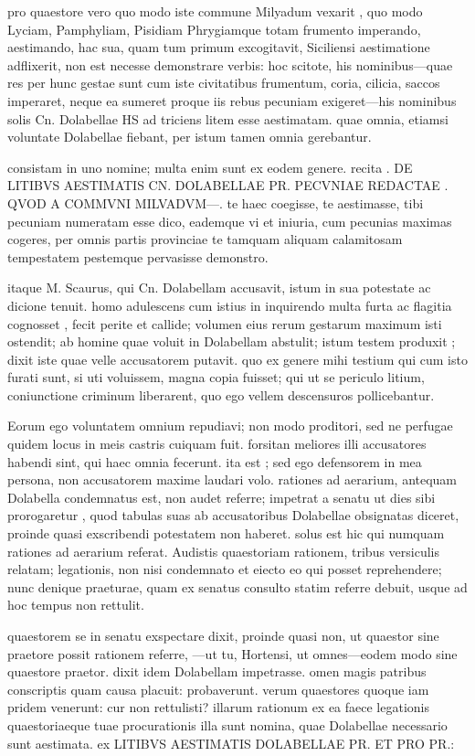  pro quaestore vero quo modo iste commune Milyadum vexarit , quo modo Lyciam, Pamphyliam, Pisidiam Phrygiamque totam frumento imperando, aestimando, hac sua, quam tum primum excogitavit, Siciliensi aestimatione adflixerit, non est necesse demonstrare verbis: hoc scitote, his nominibus—quae res per hunc gestae sunt cum iste civitatibus frumentum, coria, cilicia, saccos imperaret, neque ea sumeret proque iis rebus pecuniam exigeret—his nominibus solis Cn. Dolabellae HS ad triciens litem esse aestimatam. quae omnia, etiamsi voluntate Dolabellae fiebant, per istum tamen omnia gerebantur.

 consistam in uno nomine; multa enim sunt ex eodem genere. recita . DE LITIBVS AESTIMATIS CN. DOLABELLAE PR. PECVNIAE REDACTAE . QVOD A COMMVNI MILVADVM—. te haec coegisse, te aestimasse, tibi pecuniam numeratam esse dico, eademque vi et iniuria, cum pecunias maximas cogeres, per omnis partis provinciae te tamquam aliquam calamitosam tempestatem pestemque pervasisse demonstro.

 itaque M. Scaurus, qui Cn. Dolabellam accusavit, istum in sua potestate ac dicione tenuit. homo adulescens cum istius in inquirendo multa furta ac flagitia cognosset , fecit perite et callide; volumen eius rerum gestarum maximum isti ostendit; ab homine quae voluit in Dolabellam abstulit; istum testem produxit ; dixit iste quae velle accusatorem putavit. quo ex genere mihi testium qui cum isto furati sunt, si uti voluissem, magna copia fuisset; qui ut se periculo litium, coniunctione criminum liberarent, quo ego vellem descensuros pollicebantur.

 Eorum ego voluntatem omnium repudiavi; non modo proditori, sed ne perfugae quidem locus in meis castris cuiquam fuit. forsitan meliores illi accusatores habendi sint, qui haec omnia fecerunt. ita est ; sed ego defensorem in mea persona, non accusatorem maxime laudari volo. rationes ad aerarium, antequam Dolabella condemnatus est, non audet referre; impetrat a senatu ut dies sibi prorogaretur , quod tabulas suas ab accusatoribus Dolabellae obsignatas diceret, proinde quasi exscribendi potestatem non haberet. solus est hic qui numquam rationes ad aerarium referat. Audistis quaestoriam rationem, tribus versiculis relatam; legationis, non nisi condemnato et eiecto eo qui posset reprehendere; nunc denique praeturae, quam ex senatus consulto statim referre debuit, usque ad hoc tempus non rettulit.

 quaestorem se in senatu exspectare dixit, proinde quasi non, ut quaestor sine praetore possit rationem referre, —ut tu, Hortensi, ut omnes—eodem modo sine quaestore praetor. dixit idem Dolabellam impetrasse. omen magis patribus conscriptis quam causa placuit: probaverunt. verum quaestores quoque iam pridem venerunt: cur non rettulisti? illarum rationum ex ea faece legationis quaestoriaeque tuae procurationis illa sunt nomina, quae Dolabellae necessario sunt aestimata. ex LITIBVS AESTIMATIS DOLABELLAE PR. ET PRO PR.:

